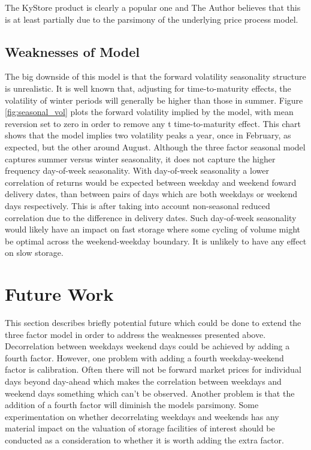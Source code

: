 \documentclass{article}
\begin{document}
The KyStore product is clearly a popular one and The Author believes that this is at least partially due 
to the parsimony of the underlying price process model.

\subsection{Weaknesses of Model}
The big downside of this model is that the forward volatility seasonality structure is unrealistic.
It is well known that, adjusting for time-to-maturity effects, the volatility of winter periods 
will generally be higher than those in summer. Figure \ref{fig:seasonal_vol} plots the forward
volatility implied by the model, with mean reversion set to zero in order to remove any t
time-to-maturity effect. This chart shows that the model implies two volatility peaks a
year, once in February, as expected, but the other around August.
Although the three factor seasonal model captures summer versus winter seasonality, it 
does not capture the higher frequency day-of-week seasonality. With day-of-week 
seasonality a lower correlation of returns would be expected between weekday and weekend 
foward delivery dates, than between pairs of days which are both weekdays or weekend days
respectively. This is after taking into account non-seasonal reduced correlation due to the 
difference in delivery dates. Such day-of-week seasonality would likely %
have an impact on fast storage where some cycling of volume might be optimal across
the weekend-weekday boundary. It is unlikely to have any effect on slow storage.

\section{Future Work}
This section describes briefly potential future which could be done to extend the three
factor model in order to address the weaknesses presented above.
Decorrelation between weekdays weekend days could be achieved by adding a fourth factor.
However, one problem with adding a fourth weekday-weekend factor is calibration. Often
there will not be forward market prices for individual days beyond day-ahead which makes
the correlation between weekdays and weekend days something which can't be observed.
Another problem is that the addition of a fourth factor will diminish the models
parsimony. Some experimentation on whether decorrelating weekdays and weekends
has any material impact on the valuation of storage facilities of interest should be
conducted as a consideration to whether it is worth adding the extra factor.
\end{document}
